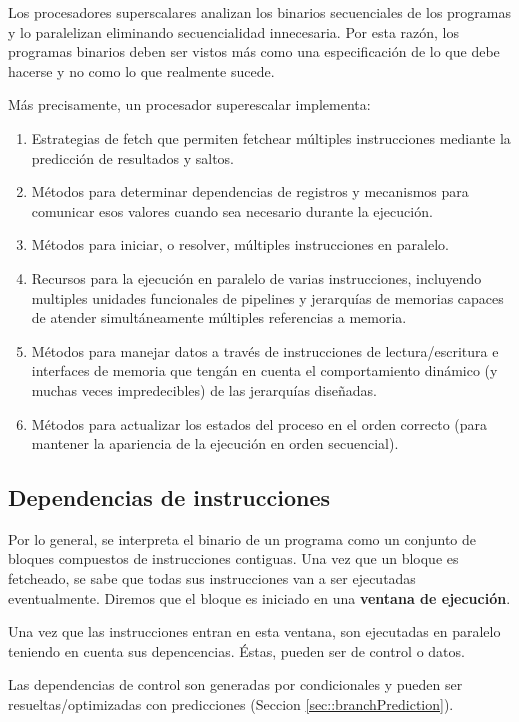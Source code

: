 Los procesadores superscalares analizan los binarios secuenciales de los programas y lo paralelizan eliminando secuencialidad innecesaria. Por esta razón, los programas binarios deben ser vistos más como una especificación de lo que debe hacerse y no como lo que realmente sucede.

Más precisamente, un procesador superescalar implementa:

\begin{enumerate}
	\item Estrategias de fetch que permiten fetchear múltiples instrucciones mediante la predicción de resultados y saltos.
	\item Métodos para determinar dependencias de registros y mecanismos para comunicar esos valores cuando sea necesario durante la ejecución.
	\item Métodos para iniciar, o resolver, múltiples instrucciones en paralelo.
	\item Recursos para la ejecución en paralelo de varias instrucciones, incluyendo multiples unidades funcionales de pipelines y jerarquías de memorias capaces de atender simultáneamente múltiples referencias a memoria.
	\item Métodos para manejar datos a través de instrucciones de lectura/escritura e interfaces de memoria que tengán en cuenta el comportamiento dinámico (y muchas veces impredecibles) de las jerarquías diseñadas.
	\item Métodos para actualizar los estados del proceso en el orden correcto (para mantener la apariencia de la ejecución en orden secuencial).
\end{enumerate}

\subsection{Dependencias de instrucciones}\label{sec:instructionLevelParalelism:dependenciaDeInstrucciones}
Por lo general, se interpreta el binario de un programa como un conjunto de bloques compuestos de instrucciones contiguas. Una vez que un bloque es fetcheado, se sabe que todas sus instrucciones van a ser ejecutadas eventualmente. Diremos que el bloque es iniciado en una \textbf{ventana de ejecución}.

Una vez que las instrucciones entran en esta ventana, son ejecutadas en paralelo teniendo en cuenta sus depencencias. Éstas, pueden ser de control o datos.

Las dependencias de control son generadas por condicionales y pueden ser resueltas/optimizadas con predicciones (Seccion \ref{sec::branchPrediction}). 

